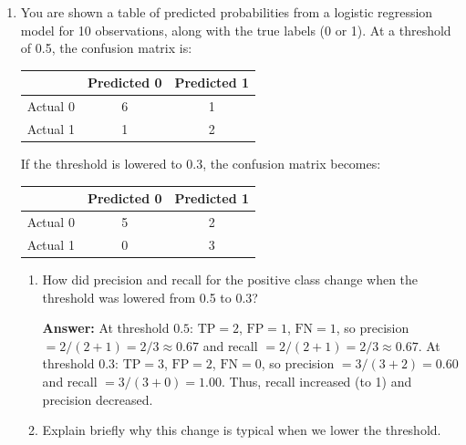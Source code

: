 \documentclass[11pt]{article}
\begin{document}
\begin{enumerate}[leftmargin=*]
\textbf{Answer:} In econometrics, LPM is attractive because the coefficients are easy to interpret as approximate \emph{marginal effects} on the probability (a one-unit change in $X_j$ changes $P(Y=1)$ by about $\beta_j$), and it fits naturally into the linear regression toolbox (fixed effects, IV, etc.). In statistical learning, LPM is problematic because it can produce predicted “probabilities” outside $[0,1]$, which are hard to interpret. The linear probablility model will also be much less flexible than other models we have seen (and particularly models we are about to see). 

\clearpage

\item You are shown a table of predicted probabilities from a logistic regression model for 10 observations, along with the true labels (0 or 1). At a threshold of 0.5, the confusion matrix is:
\begin{center}
\begin{tabular}{l|cc}
 & Predicted 0 & Predicted 1 \\\hline
Actual 0 & 6 & 1 \\
Actual 1 & 1 & 2 \\
\end{tabular}
\end{center}
If the threshold is lowered to 0.3, the confusion matrix becomes:
\begin{center}
\begin{tabular}{l|cc}
 & Predicted 0 & Predicted 1 \\\hline
Actual 0 & 5 & 2 \\
Actual 1 & 0 & 3 \\
\end{tabular}
\end{center}
\begin{enumerate}
  \item How did precision and recall for the positive class change when the threshold was lowered from 0.5 to 0.3?

  \textbf{Answer:} At threshold $0.5$: $\text{TP}=2$, $\text{FP}=1$, $\text{FN}=1$, so precision $=2/(2+1)=2/3\approx 0.67$ and recall $=2/(2+1)=2/3\approx 0.67$. At threshold $0.3$: $\text{TP}=3$, $\text{FP}=2$, $\text{FN}=0$, so precision $=3/(3+2)=0.60$ and recall $=3/(3+0)=1.00$. Thus, recall increased (to 1) and precision decreased.

  \item Explain briefly why this change is typical when we lower the threshold.


\end{enumerate}
\end{enumerate}
\end{document}
